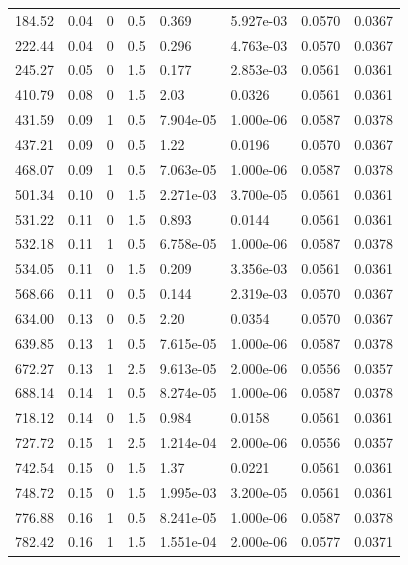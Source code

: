 \documentclass[preview]{standalone}
\begin{document}
{{\begin{tabular}{L{1.2cm}C{1.2cm} C{0.3cm}C{0.5cm} C{1.4cm}C{1.4cm} C{1.4cm}C{1.4cm}}
  184.52  &  0.04  & 0     & 0.5 &  0.369  & 5.927e-03  & 0.0570 &  0.0367   \\ 
  222.44  &  0.04  & 0     & 0.5 &  0.296  & 4.763e-03  & 0.0570 &  0.0367   \\ 
  245.27  &  0.05  & 0     & 1.5 &  0.177  & 2.853e-03  & 0.0561 &  0.0361   \\ 
  410.79  &  0.08  & 0     & 1.5 &  2.03  & 0.0326  & 0.0561 &  0.0361   \\ 
  431.59  &  0.09  & 1     & 0.5 &  7.904e-05  & 1.000e-06  & 0.0587 &  0.0378   \\ 
  437.21  &  0.09  & 0     & 0.5 &  1.22  & 0.0196  & 0.0570 &  0.0367   \\ 
  468.07  &  0.09  & 1     & 0.5 &  7.063e-05  & 1.000e-06  & 0.0587 &  0.0378   \\ 
  501.34  &  0.10  & 0     & 1.5 &  2.271e-03  & 3.700e-05  & 0.0561 &  0.0361   \\ 
  531.22  &  0.11  & 0     & 1.5 &  0.893  & 0.0144  & 0.0561 &  0.0361   \\ 
  532.18  &  0.11  & 1     & 0.5 &  6.758e-05  & 1.000e-06  & 0.0587 &  0.0378   \\ 
  534.05  &  0.11  & 0     & 1.5 &  0.209  & 3.356e-03  & 0.0561 &  0.0361   \\ 
  568.66  &  0.11  & 0     & 0.5 &  0.144  & 2.319e-03  & 0.0570 &  0.0367   \\ 
  634.00  &  0.13  & 0     & 0.5 &  2.20  & 0.0354  & 0.0570 &  0.0367   \\ 
  639.85  &  0.13  & 1     & 0.5 &  7.615e-05  & 1.000e-06  & 0.0587 &  0.0378   \\ 
  672.27  &  0.13  & 1     & 2.5 &  9.613e-05  & 2.000e-06  & 0.0556 &  0.0357   \\ 
  688.14  &  0.14  & 1     & 0.5 &  8.274e-05  & 1.000e-06  & 0.0587 &  0.0378   \\ 
  718.12  &  0.14  & 0     & 1.5 &  0.984  & 0.0158  & 0.0561 &  0.0361   \\ 
  727.72  &  0.15  & 1     & 2.5 &  1.214e-04  & 2.000e-06  & 0.0556 &  0.0357   \\ 
  742.54  &  0.15  & 0     & 1.5 &  1.37  & 0.0221  & 0.0561 &  0.0361   \\ 
  748.72  &  0.15  & 0     & 1.5 &  1.995e-03  & 3.200e-05  & 0.0561 &  0.0361   \\ 
  776.88  &  0.16  & 1     & 0.5 &  8.241e-05  & 1.000e-06  & 0.0587 &  0.0378   \\ 
  782.42  &  0.16  & 1     & 1.5 &  1.551e-04  & 2.000e-06  & 0.0577 &  0.0371   \\ 

\end{tabular}}}
\end{document}
